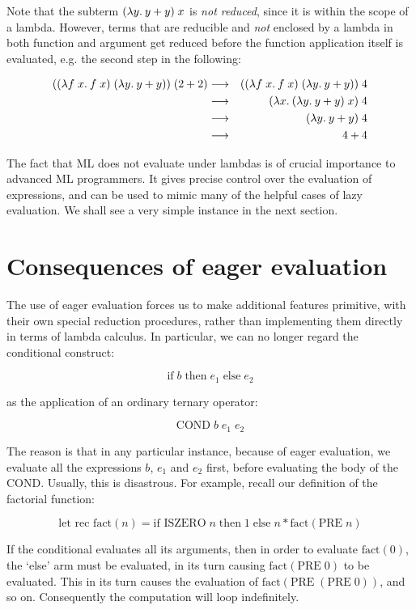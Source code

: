 Note that the subterm $(\lambda y.\: y + y)\; x$ is {\em not reduced}, since it is
within the scope of a lambda. However, terms that are reducible and {\em not}
enclosed by a lambda in both function and argument get reduced before the
function application itself is evaluated, e.g. the second step in the
following:

\begin{eqnarray*}
((\lambda f\; x.\: f\; x)\; (\lambda y.\: y + y))\; (2 + 2)
& \longrightarrow & ((\lambda f\; x.\: f\; x)\; (\lambda y.\: y + y))\; 4           \\
& \longrightarrow & (\lambda x.\: (\lambda y.\: y + y)\; x)\; 4                   \\
& \longrightarrow & (\lambda y.\: y + y)\; 4                                  \\
& \longrightarrow & 4 + 4
\end{eqnarray*}

The fact that ML does not evaluate under lambdas is of crucial importance to
advanced ML programmers. It gives precise control over the evaluation of
expressions, and can be used to mimic many of the helpful cases of lazy
evaluation. We shall see a very simple instance in the next section.

\section{Consequences of eager evaluation}

The use of eager evaluation forces us to make additional features primitive,
with their own special reduction procedures, rather than implementing them
directly in terms of lambda calculus. In particular, we can no longer regard
the conditional construct:

$$ \mbox{if}\; b\; \mbox{then}\; e_1\; \mbox{else}\; e_2 $$

\noindent as the application of an ordinary ternary operator:

$$ \mbox{COND}\; b\; e_1\; e_2 $$

The reason is that in any particular instance, because of eager evaluation, we
evaluate all the expressions $b$, $e_1$ and $e_2$ first, before evaluating the
body of the $\mbox{COND}$. Usually, this is disastrous. For example, recall our
definition of the factorial function:

$$ \mbox{let rec fact}(n) = \mbox{if ISZERO}\; n\; \mbox{then}\; 1\;
                            \mbox{else}\; n * \mbox{fact}(\mbox{PRE}\; n) $$

If the conditional evaluates all its arguments, then in order to evaluate
$\mbox{fact}(0)$, the `else' arm must be evaluated, in its turn causing
$\mbox{fact}(\mbox{PRE}\; 0)$ to be evaluated. This in its turn causes the
evaluation of $\mbox{fact}(\mbox{PRE}\; (\mbox{PRE}\; 0))$, and so on.
Consequently the computation will loop indefinitely.

